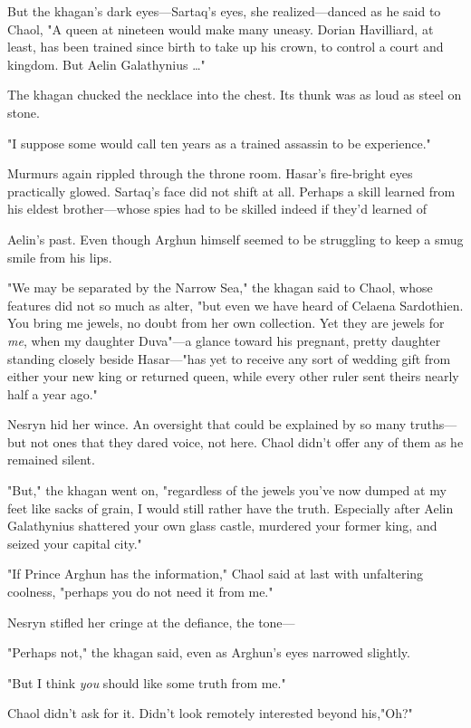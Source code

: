 But the khagan's dark eyes---Sartaq's eyes, she realized---danced as he said to Chaol, "A queen at nineteen would make many uneasy. Dorian Havilliard, at least, has been trained since birth to take up his crown, to control a court and kingdom. But Aelin Galathynius \ldots"

The khagan chucked the necklace into the chest. Its thunk was as loud as steel on stone.

"I suppose some would call ten years as a trained assassin to be experience."

Murmurs again rippled through the throne room. Hasar's fire-bright eyes practically glowed. Sartaq's face did not shift at all. Perhaps a skill learned from his eldest brother---whose spies had to be skilled indeed if they'd learned of

Aelin's past. Even though Arghun himself seemed to be struggling to keep a smug smile from his lips.

"We may be separated by the Narrow Sea," the khagan said to Chaol, whose features did not so much as alter, "but even we have heard of Celaena Sardothien. You bring me jewels, no doubt from her own collection. Yet they are jewels for \emph{me}, when my daughter Duva"---a glance toward his pregnant, pretty daughter standing closely beside Hasar---"has yet to receive any sort of wedding gift from either your new king or returned queen, while every other ruler sent theirs nearly half a year ago."

Nesryn hid her wince. An oversight that could be explained by so many truths---but not ones that they dared voice, not here. Chaol didn't offer any of them as he remained silent.

"But," the khagan went on, "regardless of the jewels you've now dumped at my feet like sacks of grain, I would still rather have the truth. Especially after Aelin Galathynius shattered your own glass castle, murdered your former king, and seized your capital city."

"If Prince Arghun has the information," Chaol said at last with unfaltering coolness, "perhaps you do not need it from me."

Nesryn stifled her cringe at the defiance, the tone---

"Perhaps not," the khagan said, even as Arghun's eyes narrowed slightly.

"But I think \emph{you} should like some truth from me."

Chaol didn't ask for it. Didn't look remotely interested beyond his,"Oh?"


